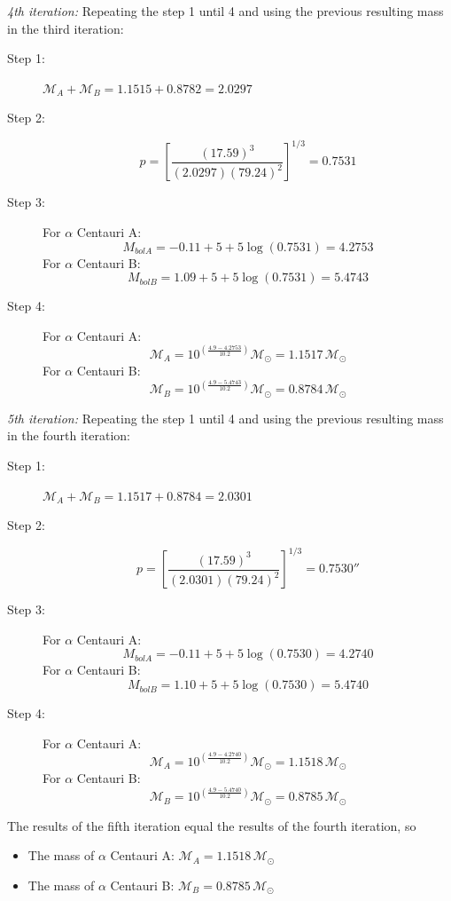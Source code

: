 \begin{description}
  \emph{4th iteration:} Repeating the step 1 until 4 and using the previous
  resulting mass in the third iteration:
  \begin{description}
  \item[Step 1:] $\mathcal{M}_A + \mathcal{M}_B = 1.1515 + 0.8782 = 2.0297$
  \item[Step 2:]
    \[ p = \left[ \frac{(17.59)^3}{(2.0297)(79.24)^2} \right]^{1/3}
         = 0.7531 \]
  \item[Step 3:] For $\alpha$ Centauri A:
    \[ M_{bolA} = -0.11 + 5 + 5\log(0.7531) = 4.2753 \]
    For $\alpha$ Centauri B:
    \[ M_{bolB} = 1.09 + 5 + 5\log(0.7531) = 5.4743 \]
  \item[Step 4:] For $\alpha$ Centauri A:
    \[ \mathcal{M}_A
       = 10^{\left( \frac{4.9 - 4.2753}{10.2} \right)} \mathcal{M}_\odot
       = 1.1517\,\mathcal{M}_\odot \]
    For $\alpha$ Centauri B:
    \[ \mathcal{M}_B
       = 10^{\left( \frac{4.9 - 5.4743}{10.2} \right)} \mathcal{M}_\odot
       = 0.8784\,\mathcal{M}_\odot \]
  \end{description}

  \emph{5th iteration:} Repeating the step 1 until 4 and using the previous
  resulting mass in the fourth iteration:
  \begin{description}
  \item[Step 1:] $\mathcal{M}_A + \mathcal{M}_B = 1.1517 + 0.8784 = 2.0301$
  \item[Step 2:]
    \[ p = \left[ \frac{(17.59)^3}{(2.0301)(79.24)^2} \right]^{1/3}
         = 0.7530'' \]
  \item[Step 3:] For $\alpha$ Centauri A:
    \[ M_{bolA} = -0.11 + 5 + 5\log(0.7530) = 4.2740 \]
    For $\alpha$ Centauri B:
    \[ M_{bolB} = 1.10 + 5 + 5\log(0.7530) = 5.4740 \]
  \item[Step 4:] For $\alpha$ Centauri A:
    \[ \mathcal{M}_A
       = 10^{\left( \frac{4.9 - 4.2740}{10.2} \right)} \mathcal{M}_\odot
       = 1.1518\,\mathcal{M}_\odot \]
    For $\alpha$ Centauri B:
    \[ \mathcal{M}_B
       = 10^{\left( \frac{4.9 - 5.4740}{10.2} \right)} \mathcal{M}_\odot
       = 0.8785\,\mathcal{M}_\odot \]
  \end{description}

  The results of the fifth iteration equal the results of the fourth
  iteration, so
  \begin{itemize}
  \item The mass of $\alpha$ Centauri A:
    $\mathcal{M}_A = 1.1518\,\mathcal{M}_\odot$
  \item The mass of $\alpha$ Centauri B:
    $\mathcal{M}_B = 0.8785\,\mathcal{M}_\odot$
  \end{itemize}
\end{description}

